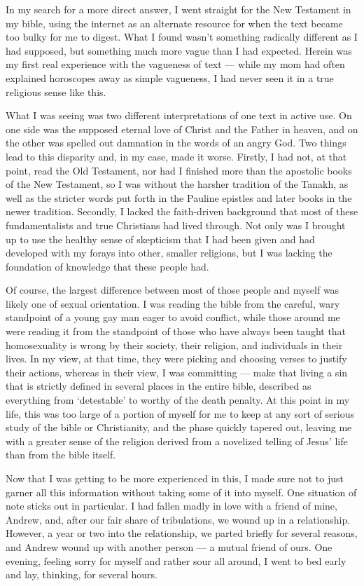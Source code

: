 In my search for a more direct answer, I went straight for the New Testament in my bible, using the internet as an alternate resource for when the text became too bulky for me to digest. What I found wasn't something radically different as I had supposed, but something much more vague than I had expected. Herein was my first real experience with the vagueness of text --- while my mom had often explained horoscopes away as simple vagueness, I had never seen it in a true religious sense like this.

What I was seeing was two different interpretations of one text in active use. On one side was the supposed eternal love of Christ and the Father in heaven, and on the other was spelled out damnation in the words of an angry God. Two things lead to this disparity and, in my case, made it worse. Firstly, I had not, at that point, read the Old Testament, nor had I finished more than the apostolic books of the New Testament, so I was without the harsher tradition of the Tanakh, as well as the stricter words put forth in the Pauline epistles and later books in the newer tradition. Secondly, I lacked the faith-driven background that most of these fundamentalists and true Christians had lived through. Not only was I brought up to use the healthy sense of skepticism that I had been given and had developed with my forays into other, smaller religions, but I was lacking the foundation of knowledge that these people had.

Of course, the largest difference between most of those people and myself was likely one of sexual orientation. I was reading the bible from the careful, wary standpoint of a young gay man eager to avoid conflict, while those around me were reading it from the standpoint of those who have always been taught that homosexuality is wrong by their society, their religion, and individuals in their lives. In my view, at that time, they were picking and choosing verses to justify their actions, whereas in their view, I was committing --- make that living a sin that is strictly defined in several places in the entire bible, described as everything from `detestable' to worthy of the death penalty. At this point in my life, this was too large of a portion of myself for me to keep at any sort of serious study of the bible or Christianity, and the phase quickly tapered out, leaving me with a greater sense of the religion derived from a novelized telling of Jesus' life than from the bible itself.

Now that I was getting to be more experienced in this, I made sure not to just garner all this information without taking some of it into myself. One situation of note sticks out in particular. I had fallen madly in love with a friend of mine, Andrew, and, after our fair share of tribulations, we wound up in a relationship. However, a year or two into the relationship, we parted briefly for several reasons, and Andrew wound up with another person --- a mutual friend of ours. One evening, feeling sorry for myself and rather sour all around, I went to bed early and lay, thinking, for several hours.


